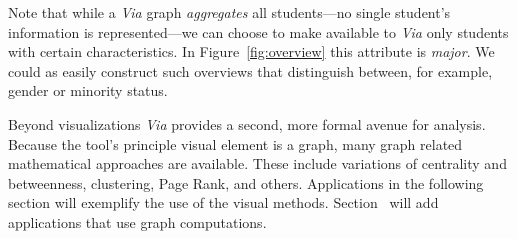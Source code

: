 Note that while a {\em Via} graph {\em aggregates} all students---no
single student's information is represented---we can choose to make
available to {\em Via} only students with certain characteristics. In
Figure~\ref{fig:overview} this attribute is {\em major}. We could as
easily construct such overviews that distinguish between, for example,
gender or minority status.

Beyond visualizations {\em Via} provides a second, more formal avenue
for analysis. Because the tool's principle visual element is a graph, many
graph related mathematical approaches are available. These include
variations of centrality and betweenness, clustering, Page Rank, and
others. Applications in the following section will exemplify the use
of the visual methods. Section~ will add
applications that use graph computations.
